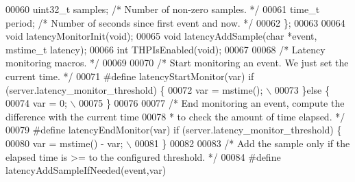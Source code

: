 \begin{DoxyCode}
00060     uint32\_t samples;       \textcolor{comment}{/* Number of non-zero samples. */}
00061     time\_t period;          \textcolor{comment}{/* Number of seconds since first event and now. */}
00062 \};
00063 
00064 \textcolor{keywordtype}{void} latencyMonitorInit(\textcolor{keywordtype}{void});
00065 \textcolor{keywordtype}{void} latencyAddSample(\textcolor{keywordtype}{char} *event, mstime\_t latency);
00066 \textcolor{keywordtype}{int} THPIsEnabled(\textcolor{keywordtype}{void});
00067 
00068 \textcolor{comment}{/* Latency monitoring macros. */}
00069 
00070 \textcolor{comment}{/* Start monitoring an event. We just set the current time. */}
00071 \textcolor{preprocessor}{#}\textcolor{preprocessor}{define} \textcolor{preprocessor}{latencyStartMonitor}\textcolor{preprocessor}{(}\textcolor{preprocessor}{var}\textcolor{preprocessor}{)} \textcolor{keywordflow}{if} \textcolor{preprocessor}{(}\textcolor{preprocessor}{server}\textcolor{preprocessor}{.}\textcolor{preprocessor}{latency\_monitor\_threshold}\textcolor{preprocessor}{)} \textcolor{preprocessor}{\{}
00072     \textcolor{preprocessor}{var} \textcolor{preprocessor}{=} \textcolor{preprocessor}{mstime}\textcolor{preprocessor}{(}\textcolor{preprocessor}{)}\textcolor{preprocessor}{;} \textcolor{preprocessor}{\(\backslash\)}
00073 \textcolor{preprocessor}{\}}\textcolor{keywordflow}{else} \textcolor{preprocessor}{\{}
00074     \textcolor{preprocessor}{var} \textcolor{preprocessor}{=} 0\textcolor{preprocessor}{;} \textcolor{preprocessor}{\(\backslash\)}
00075 \textcolor{preprocessor}{\}}
00076 
00077 \textcolor{comment}{/* End monitoring an event, compute the difference with the current time}
00078 \textcolor{comment}{ * to check the amount of time elapsed. */}
00079 \textcolor{preprocessor}{#}\textcolor{preprocessor}{define} \textcolor{preprocessor}{latencyEndMonitor}\textcolor{preprocessor}{(}\textcolor{preprocessor}{var}\textcolor{preprocessor}{)} \textcolor{keywordflow}{if} \textcolor{preprocessor}{(}\textcolor{preprocessor}{server}\textcolor{preprocessor}{.}\textcolor{preprocessor}{latency\_monitor\_threshold}\textcolor{preprocessor}{)} \textcolor{preprocessor}{\{}
00080     \textcolor{preprocessor}{var} \textcolor{preprocessor}{=} \textcolor{preprocessor}{mstime}\textcolor{preprocessor}{(}\textcolor{preprocessor}{)} \textcolor{preprocessor}{-} \textcolor{preprocessor}{var}\textcolor{preprocessor}{;} \textcolor{preprocessor}{\(\backslash\)}
00081 \textcolor{preprocessor}{\}}
00082 
00083 \textcolor{comment}{/* Add the sample only if the elapsed time is >= to the configured threshold. */}
00084 \textcolor{preprocessor}{#}\textcolor{preprocessor}{define} \textcolor{preprocessor}{latencyAddSampleIfNeeded}\textcolor{preprocessor}{(}\textcolor{preprocessor}{event}\textcolor{preprocessor}{,}\textcolor{preprocessor}{var}\textcolor{preprocessor}{)}

\end{DoxyCode}

